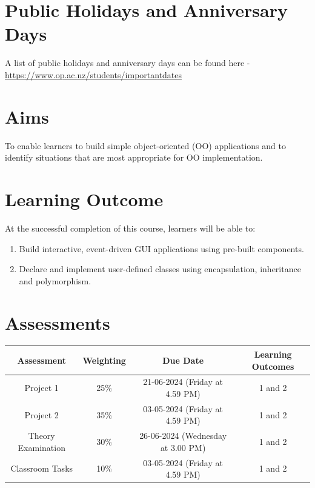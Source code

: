 \documentclass{article}
\begin{document}
\section*{Public Holidays and Anniversary Days}
A list of public holidays and anniversary days can be found here - \href{https://www.op.ac.nz/students/importantdates}{https://www.op.ac.nz/students/importantdates}

\section*{Aims}
To enable learners to build simple object-oriented (OO) applications and to identify situations that are most appropriate for OO implementation.

\section*{Learning Outcome}
At the successful completion of this course, learners will be able to:
\begin{enumerate}
	\item Build interactive, event-driven GUI applications using pre-built components.
	\item Declare and implement user-defined classes using encapsulation, inheritance and polymorphism.
\end{enumerate}

\section*{Assessments}
\renewcommand{\arraystretch}{1.5}
\begin{tabular}{|c|c|c|c|}
	\hline
	\textbf{Assessment}                                 & \textbf{Weighting} & \textbf{Due Date}            & \textbf{Learning Outcomes} \\ \hline
	\small Project 1 & \small 25\%        & \small 21-06-2024 (Friday at 4.59 PM)  & \small 1 and 2                   \\ \hline
	\small Project 2  & \small 35\%        & \small 03-05-2024 (Friday at 4.59 PM)   & \small 1 and 2                   \\ \hline
	\small Theory Examination                        & \small 30\%        & \small 26-06-2024 (Wednesday at 3.00 PM)  & \small 1 and 2                   \\ \hline
	\small Classroom Tasks                      & \small 10\%        & \small 03-05-2024 (Friday at 4.59 PM)  & \small 1 and 2                   \\ \hline
\end{tabular} 
\end{document}
